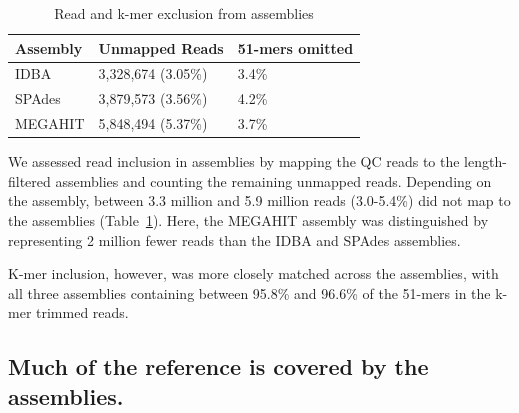\documentclass[10pt,a4paper,twocolumn]{article}
\begin{document}


\begin{table}[!h]
\centering
\caption{Read and k-mer exclusion from assemblies}
\begin{tabular}{|p{1.5cm}|p{1.5cm}|p{2.5cm}|}\hline
  \textbf{Assembly} & \textbf{Unmapped Reads} & \textbf {51-mers omitted}
  \\ \hline
IDBA &3,328,674 (3.05\%)&  3.4\% \\ \hline
SPAdes &3,879,573 (3.56\%) &  4.2\% \\ \hline
MEGAHIT &5,848,494 (5.37\%) &   3.7\% \\ \hline
\end{tabular}
\label{table:reads-kmers}
\end{table}

We assessed read inclusion in assemblies by mapping the QC reads to
the length-filtered assemblies and counting the remaining unmapped
reads. Depending on the assembly, between 3.3 million and 5.9 million
reads (3.0-5.4\%) did not map to the assemblies
(Table~\ref{table:reads-kmers}). Here, the MEGAHIT assembly was distinguished by representing 2 million fewer reads than the IDBA and SPAdes assemblies.

K-mer inclusion, however, was more closely matched across the assemblies,
with all three assemblies containing between 95.8\% and 96.6\% of the
51-mers in the k-mer trimmed reads.



\subsection*{Much of the reference is covered by the assemblies.}


\end{document}
